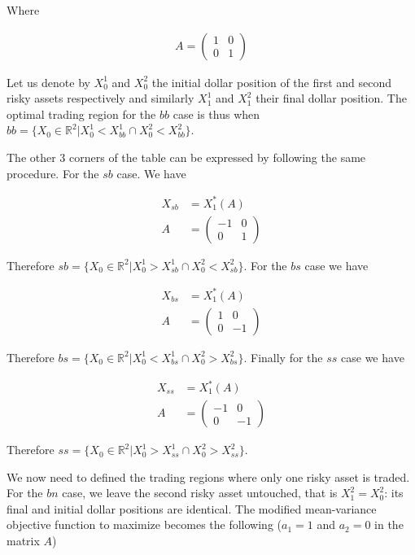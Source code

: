 \documentclass[10pt]{article}
\begin{document}
Where 

\begin{align*}
	A = \begin{pmatrix}
	1 & 0\\	
	0 & 1
\end{pmatrix}
\end{align*}

Let us denote by $X_0^1$ and $X_0^2$ the initial dollar position of the first and second risky assets respectively and similarly $X_1^1$ and $X_1^2$ their final dollar position. The optimal trading region for the $bb$ case is thus when $bb = \{ X_0 \in \mathbb{R}^2 \vert X_0^1 < X_{bb}^1 \cap  X_0^2 < X_{bb}^2\}$.

\bigbreak

The other 3 corners of the table can be expressed by following the same procedure. For the $sb$ case. We have 

\begin{align*}
	X_{sb} &= X_1^*(A) \\
	A &=  \begin{pmatrix}
	-1 & 0\\	
	0 & 1
\end{pmatrix}
\end{align*}

Therefore $sb = \{X_0 \in \mathbb{R}^2 \vert X_0^1 > X_{sb}^1 \cap  X_0^2 < X_{sb}^2\}$. For the $bs$ case we have 

\begin{align*}
		X_{bs} &= X_1^*(A) \\
	A &=  \begin{pmatrix}
	1 & 0\\	
	0 & -1
\end{pmatrix}
\end{align*}

Therefore $bs = \{X_0 \in \mathbb{R}^2 \vert X_0^1 < X_{bs}^1 \cap  X_0^2 > X_{bs}^2\}$. Finally for the $ss$ case we have 

\begin{align*}
		X_{ss} &= X_1^*(A) \\
	A &=  \begin{pmatrix}
	-1 & 0\\	
	0 & -1
\end{pmatrix}
\end{align*}

Therefore $ss = \{ X_0 \in \mathbb{R}^2 \vert X_0^1 > X_{ss}^1 \cap  X_0^2 > X_{ss}^2\}$.

\bigbreak

We now need to defined the trading regions where only one risky asset is traded. For the $bn$ case, we leave the second risky asset untouched, that is $X_1^2 = X_0^2$: its final and initial dollar positions are identical. The modified mean-variance objective function to maximize becomes the following ($a_1 = 1$ and $a_2 = 0$ in the matrix $A$)
\end{document}
